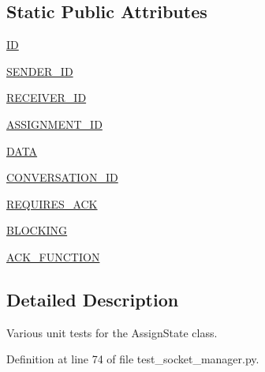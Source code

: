 \subsection*{Static Public Attributes}
\begin{DoxyCompactItemize}
\item 
\hyperlink{classparlai_1_1mturk_1_1core_1_1test_1_1test__socket__manager_1_1TestPacket_aa9a0cdbaf7edd7f80a816747c5d3f25b}{ID}
\item 
\hyperlink{classparlai_1_1mturk_1_1core_1_1test_1_1test__socket__manager_1_1TestPacket_a863d75a0446f6c3857c24dc072ee5ecc}{S\+E\+N\+D\+E\+R\+\_\+\+ID}
\item 
\hyperlink{classparlai_1_1mturk_1_1core_1_1test_1_1test__socket__manager_1_1TestPacket_a8320131823273b69a95abd1122278fc2}{R\+E\+C\+E\+I\+V\+E\+R\+\_\+\+ID}
\item 
\hyperlink{classparlai_1_1mturk_1_1core_1_1test_1_1test__socket__manager_1_1TestPacket_ab80ecda60182776d13494296d9602eca}{A\+S\+S\+I\+G\+N\+M\+E\+N\+T\+\_\+\+ID}
\item 
\hyperlink{classparlai_1_1mturk_1_1core_1_1test_1_1test__socket__manager_1_1TestPacket_a8baaaa8392c1de0b4e9776e5b17110fc}{D\+A\+TA}
\item 
\hyperlink{classparlai_1_1mturk_1_1core_1_1test_1_1test__socket__manager_1_1TestPacket_af357033fde89f3c44d04bd82c2ea0b9b}{C\+O\+N\+V\+E\+R\+S\+A\+T\+I\+O\+N\+\_\+\+ID}
\item 
\hyperlink{classparlai_1_1mturk_1_1core_1_1test_1_1test__socket__manager_1_1TestPacket_a086d5481be1dd3ef9a27bbb5b753a1ce}{R\+E\+Q\+U\+I\+R\+E\+S\+\_\+\+A\+CK}
\item 
\hyperlink{classparlai_1_1mturk_1_1core_1_1test_1_1test__socket__manager_1_1TestPacket_a2cae239fb50dcc34e325302fd85f3824}{B\+L\+O\+C\+K\+I\+NG}
\item 
\hyperlink{classparlai_1_1mturk_1_1core_1_1test_1_1test__socket__manager_1_1TestPacket_a8128dd7252762d1f74e0902606351428}{A\+C\+K\+\_\+\+F\+U\+N\+C\+T\+I\+ON}
\end{DoxyCompactItemize}


\subsection{Detailed Description}
\begin{DoxyVerb}Various unit tests for the AssignState class.
\end{DoxyVerb}
 

Definition at line 74 of file test\+\_\+socket\+\_\+manager.\+py.



